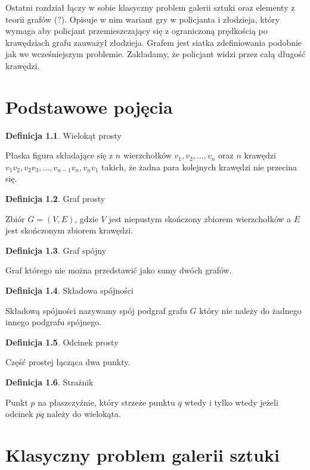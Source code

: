 \documentclass[brudnopis]{xmgr}
\theoremstyle{definition}
\newtheorem{Definicja}{Definicja}
\begin{document}
Ostatni rozdział łączy w sobie klasyczny problem galerii sztuki oraz elementy z teorii grafów (?). Opisuje w nim wariant gry w policjanta i złodzieja, który wymaga aby policjant przemieszczający się z ograniczoną prędkością po krawędziach grafu zauważył złodzieja. Grafem jest siatka zdefiniowania podobnie jak we wcześniejszym problemie. Zakładamy, że policjant widzi przez całą długość krawędzi.


\chapter{Podstawowe pojęcia}

\begin{Definicja}{Wielokąt prosty}

  Płaska figura składające się z $n$ wierzchołków $v_1, v_2,\ldots, v_n$ oraz $n$ krawędzi $v_1v_2, v_2v_3, \ldots, v_{n-1}v_n,v_nv_1$ takich, że żadna para kolejnych krawędzi nie przecina się.
\end{Definicja}

\begin{Definicja}{Graf prosty}

  Zbiór $G = (V,E)$, gdzie $V$ jest niepustym skończony zbiorem wierzchołków a $E$ jest skończonym zbiorem krawędzi.
\end{Definicja}

\begin{Definicja}{Graf spójny}

  Graf którego nie można przedstawić jako sumy dwóch grafów.
\end{Definicja}

\begin{Definicja}{Składowa spójności}
  
  Składową spójności nazywamy spój podgraf grafu $G$ który nie należy do żadnego innego podgrafu spójnego.
\end{Definicja}

\begin{Definicja}{Odcinek prosty}

  Część prostej łącząca dwa punkty.
\end{Definicja}

\begin{Definicja}{Strażnik}

  Punkt $p$ na płaszczyźnie, który strzeże punktu $q$ wtedy i tylko wtedy jeżeli odcinek $\overline{pq}$ należy do wielokąta.
\end{Definicja}

\chapter{Klasyczny problem galerii sztuki}
\end{document}
